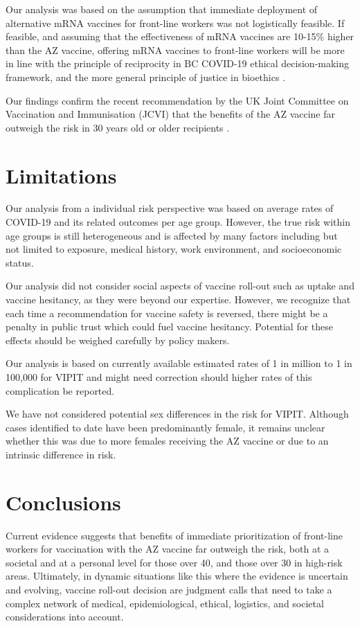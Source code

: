 \documentclass[]{interact}
\theoremstyle{plain}%
\theoremstyle{definition}
\theoremstyle{remark}
\begin{document}
Our analysis was based on the assumption that immediate deployment of
alternative mRNA vaccines for front-line workers was not logistically
feasible. If feasible, and assuming that the effectiveness of mRNA
vaccines are 10-15\% higher than the AZ vaccine, offering mRNA vaccines
to front-line workers will be more in line with the principle of
reciprocity in BC COVID-19 ethical decision-making
framework\citep{bccdc_covid-19_2020}, and the more general principle of
justice in bioethics \citep{mccormick_principles_2021}.

Our findings confirm the recent recommendation by the UK Joint Committee
on Vaccination and Immunisation (JCVI) that the benefits of the AZ
vaccine far outweigh the risk in 30 years old or older recipients
\citep{jcvi_jcvi_2021}.

\hypertarget{limitations}{%
\section{Limitations}\label{limitations}}

Our analysis from a individual risk perspective was based on average
rates of COVID-19 and its related outcomes per age group. However, the
true risk within age groups is still heterogeneous and is affected by
many factors including but not limited to exposure, medical history,
work environment, and socioeconomic status.

Our analysis did not consider social aspects of vaccine roll-out such as
uptake and vaccine hesitancy, as they were beyond our expertise.
However, we recognize that each time a recommendation for vaccine safety
is reversed, there might be a penalty in public trust which could fuel
vaccine hesitancy. Potential for these effects should be weighed
carefully by policy makers.

Our analysis is based on currently available estimated rates of 1 in
million to 1 in 100,000 for VIPIT and might need correction should
higher rates of this complication be reported.

We have not considered potential sex differences in the risk for VIPIT.
Although cases identified to date have been predominantly female, it
remains unclear whether this was due to more females receiving the AZ
vaccine or due to an intrinsic difference in risk.

\hypertarget{conclusions}{%
\section{Conclusions}\label{conclusions}}

Current evidence suggests that benefits of immediate prioritization of
front-line workers for vaccination with the AZ vaccine far outweigh the
risk, both at a societal and at a personal level for those over 40, and
those over 30 in high-risk areas. Ultimately, in dynamic situations like
this where the evidence is uncertain and evolving, vaccine roll-out
decision are judgment calls that need to take a complex network of
medical, epidemiological, ethical, logistics, and societal
considerations into account.



\end{document}
